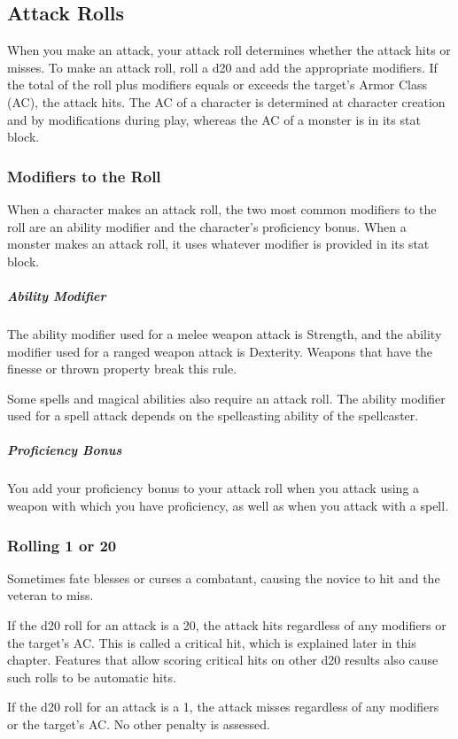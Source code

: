 \subsection{Attack Rolls}

When you make an attack, your attack roll determines whether the attack hits or misses. To make an attack roll, roll a d20 and add the appropriate modifiers. If the total of the roll plus modifiers equals or exceeds the target's Armor Class (AC), the attack hits. The AC of a character is determined at character creation and by modifications during play, whereas the AC of a monster is in its stat block.

\subsubsection{Modifiers to the Roll}

When a character makes an attack roll, the two most common modifiers to the roll are an ability modifier and the character's proficiency bonus. When a monster makes an attack roll, it uses whatever modifier is provided in its stat block.

\subparagraph*{Ability Modifier} The ability modifier used for a melee weapon attack is Strength, and the ability modifier used for a ranged weapon attack is Dexterity. Weapons that have the finesse or thrown property break this rule.

Some spells and magical abilities also require an attack roll. The ability modifier used for a spell attack depends on the spellcasting ability of the spellcaster.

\subparagraph*{Proficiency Bonus} You add your proficiency bonus to your attack roll when you attack using a weapon with which you have proficiency, as well as when you attack with a spell.

\subsubsection{Rolling 1 or 20}

Sometimes fate blesses or curses a combatant, causing the novice to hit and the veteran to miss.

If the d20 roll for an attack is a 20, the attack hits regardless of any modifiers or the target's AC. This is called a critical hit, which is explained later in this chapter. Features that allow scoring critical hits on other d20 results also cause such rolls to be automatic hits.

If the d20 roll for an attack is a 1, the attack misses regardless of any modifiers or the target's AC. No other penalty is assessed.

